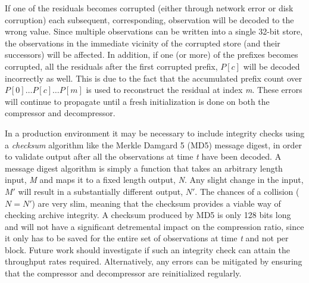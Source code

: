   If one of the residuals becomes corrupted (either through network error or disk corruption) each subsequent, corresponding, 
  observation will be decoded to the wrong value. Since multiple observations can be written into a single 32-bit store, the observations in the immediate vicinity of the corrupted
  store (and their successors) will be affected. In addition, if one (or more) of the prefixes becomes corrupted, all the residuals after the first corrupted prefix, $P[c]$ will be decoded 
  incorrectly as well. This is due to the fact that the accumulated prefix count over $P[0]\dots P[c]\dots P[m]$ is used to reconstruct the residual at index \textit{m}. These 
  errors will continue to propagate until a fresh initialization is done on both the compressor and decompressor. 
    
  In a production environment it may be necessary to include integrity checks using a \textit{checksum} algorithm like the Merkle Damgard 5 (MD5) message digest, in order to validate output after all the observations
  at time \textit{t} have been decoded. A message digest algorithm is simply a function that takes an arbitrary length input, \textit{M} and maps it to a fixed length output, 
  \textit{N}. Any slight change in the input, $M'$ will result in a substantially different output, $N'$. The chances of a collision ($N = N'$) are very slim, meaning that 
  the checksum provides a viable way of checking archive integrity. A checksum produced by MD5 is only 128 bits long and will not have a significant detremental impact on the
  compression ratio, since it only has to be saved for the entire set of observations at time \textit{t} and not per block. Future work should investigate if such an integrity
  check can attain the throughput rates required. Alternatively, any errors can be mitigated by ensuring that the compressor and decompressor are reinitialized regularly.

